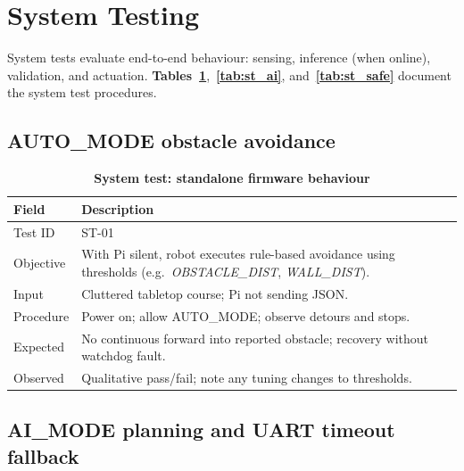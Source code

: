 \section{System Testing}
\label{sec:system_testing}

System tests evaluate end-to-end behaviour: sensing, inference (when online), validation, and actuation. \textbf{Tables~\ref{tab:st_auto}},~\textbf{\ref{tab:st_ai}}, and~\textbf{\ref{tab:st_safe}} document the system test procedures.

\subsection[AUTO mode avoidance]{AUTO\_MODE obstacle avoidance}
\label{subsec:st_auto}

\begin{table}[H]
\centering
\caption[System test: standalone firmware behaviour]{\textbf{System test: standalone firmware behaviour}}
\label{tab:st_auto}
\begin{tabularx}{\textwidth}{|>{\raggedright\arraybackslash}p{3.1cm}|X|}
\hline
\textbf{Field} & \textbf{Description} \\
\hline
Test ID & ST-01 \\
\hline
Objective & With Pi silent, robot executes rule-based avoidance using thresholds (e.g.\ \textit{OBSTACLE\_DIST}, \textit{WALL\_DIST}). \\
\hline
Input & Cluttered tabletop course; Pi not sending JSON. \\
\hline
Procedure & Power on; allow AUTO\_MODE; observe detours and stops. \\
\hline
Expected & No continuous forward into reported obstacle; recovery without watchdog fault. \\
\hline
Observed & Qualitative pass/fail; note any tuning changes to thresholds. \\
\hline
\end{tabularx}
\end{table}

\subsection[AI mode and fallback]{AI\_MODE planning and UART timeout fallback}
\label{subsec:st_ai}

